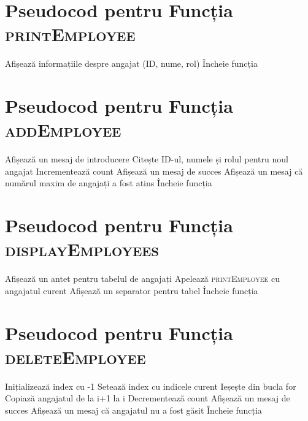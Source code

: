 \documentclass[12pt,a4paper]{article}
\begin{document}
\section*{Pseudocod pentru Funcția \textsc{printEmployee}}
\begin{algorithm}
\begin{algorithmic}[1]
    \State Afișează informațiile despre angajat (ID, nume, rol)
    \State Încheie funcția
\end{algorithmic}
\end{algorithm}

\section*{Pseudocod pentru Funcția \textsc{addEmployee}}
\begin{algorithm}
\begin{algorithmic}[1]
        \State Afișează un mesaj de introducere
        \State Citește ID-ul, numele și rolul pentru noul angajat
        \State Incrementează count
        \State Afișează un mesaj de succes
    \Else
        \State Afișează un mesaj că numărul maxim de angajați a fost atins
    \EndIf
    \State Încheie funcția
\end{algorithmic}
\end{algorithm}

\section*{Pseudocod pentru Funcția \textsc{displayEmployees}}
\begin{algorithm}
\begin{algorithmic}[1]
    \State Afișează un antet pentru tabelul de angajați
        \State Apelează \textsc{printEmployee} cu angajatul curent
    \EndFor
    \State Afișează un separator pentru tabel
    \State Încheie funcția
\end{algorithmic}
\end{algorithm}

\newpage

\section*{Pseudocod pentru Funcția \textsc{deleteEmployee}}
\begin{algorithm}
\begin{algorithmic}[1]
    \State Inițializează index cu -1
            \State Setează index cu indicele curent
            \State Ieșește din bucla for
        \EndIf
    \EndFor
            \State Copiază angajatul de la i+1 la i
        \EndFor
        \State Decrementează count
        \State Afișează un mesaj de succes
    \Else
        \State Afișează un mesaj că angajatul nu a fost găsit
    \EndIf
    \State Încheie funcția
\end{algorithmic}
\end{algorithm}
\end{document}
